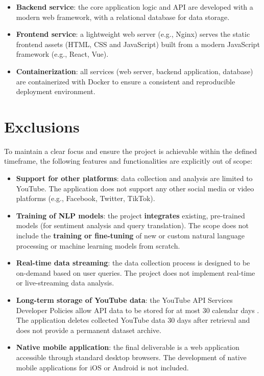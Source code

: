 \begin{itemize}
    \item \textbf{Backend service}: the core application logic and API are developed with a modern web framework, with a relational database for data storage.

    \item \textbf{Frontend service}: a lightweight web server (e.g., Nginx) serves the static frontend assets (HTML, CSS and JavaScript) built from a modern JavaScript framework (e.g., React, Vue).

    \item \textbf{Containerization}: all services (web server, backend application, database) are containerized with Docker to ensure a consistent and reproducible deployment environment.
\end{itemize}

\section{Exclusions}

To maintain a clear focus and ensure the project is achievable within the defined timeframe, the following features and functionalities are explicitly out of scope:

\begin{itemize}
    \item \textbf{Support for other platforms}: data collection and analysis are limited to YouTube. The application does not support any other social media or video platforms (e.g., Facebook, Twitter, TikTok).

    \item \textbf{Training of NLP models}: the project \textbf{integrates} existing, pre-trained models (for sentiment analysis and query translation). The scope does not include the \textbf{training or fine-tuning} of new or custom natural language processing or machine learning models from scratch.

    \item \textbf{Real-time data streaming}: the data collection process is designed to be on-demand based on user queries. The project does not implement real-time or live-streaming data analysis.

    \item \textbf{Long-term storage of YouTube data}: the YouTube API Services Developer Policies allow API data to be stored for at most 30 calendar days \autocite{youtube_api_services_developer_policies}. The application deletes collected YouTube data 30 days after retrieval and does not provide a permanent dataset archive.

    \item \textbf{Native mobile application}: the final deliverable is a web application accessible through standard desktop browsers. The development of native mobile applications for iOS or Android is not included.
\end{itemize}
